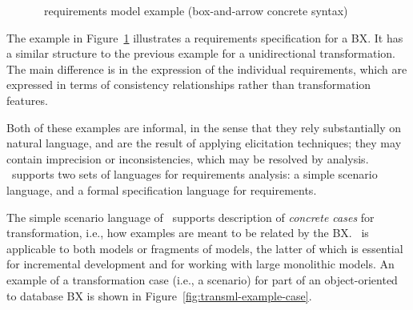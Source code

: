 \begin{figure}[htbp]
\caption{\transml\ requirements model example (box-and-arrow concrete syntax)}
\label{fig:transml-requirements-example2}
\end{figure}

The example in Figure~\ref{fig:transml-requirements-example2} illustrates a requirements specification for a BX. It has a similar structure to the previous example for a unidirectional transformation. The main difference is in the expression of the individual requirements, which are expressed in terms of consistency relationships rather than transformation features. 

Both of these examples are informal, in the sense that they rely substantially on natural language, and are the result of applying elicitation techniques; they may contain imprecision or inconsistencies, which may be resolved by analysis. \transml\ supports two sets of languages for requirements analysis: a simple scenario language, and a formal specification language for requirements. 

The simple scenario language of \transml\ supports description of \textit{concrete cases} for transformation, i.e., how examples are meant to be related by the BX. \transml\ is applicable to both models or fragments of models, the latter of which is essential for incremental development and for working with large monolithic models. An example of a transformation case (i.e., a scenario) for part of an object-oriented to database BX is shown in Figure~\ref{fig:transml-example-case}.

